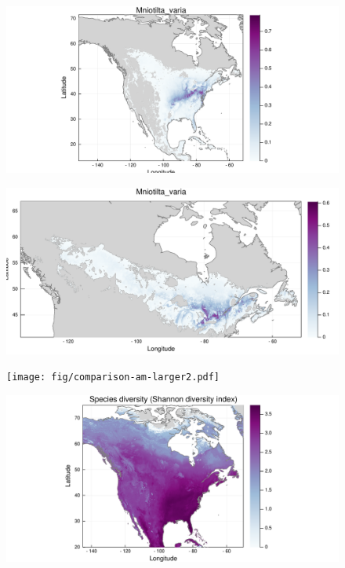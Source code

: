 \documentclass[10pt]{beamer}
\begin{document}
\begin{frame}
  \begin{figure}
    \centering
    \includegraphics[scale=0.4]{fig/sdm-am-Mniotilta_varia.pdf}
  \end{figure}
\end{frame}

\begin{frame}
  \begin{figure}
    \centering
    \includegraphics[scale=0.32]{fig/sdm-can-Mniotilta_varia.pdf}
  \end{figure}
\end{frame}

\begin{frame}
  \begin{figure}
    \centering
    \texttt{[image: fig/comparison-am-larger2.pdf]}
  \end{figure}
\end{frame}

\begin{frame}
  \begin{figure}
    \centering
    \includegraphics[scale=0.4]{fig/diversity-am-larger2.pdf}
  \end{figure}
\end{frame}
\end{document}
